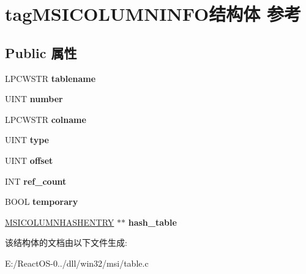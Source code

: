 \hypertarget{structtag_m_s_i_c_o_l_u_m_n_i_n_f_o}{}\section{tag\+M\+S\+I\+C\+O\+L\+U\+M\+N\+I\+N\+F\+O结构体 参考}
\label{structtag_m_s_i_c_o_l_u_m_n_i_n_f_o}
\subsection*{Public 属性}
\begin{DoxyCompactItemize}
\item 
\mbox{\label{structtag_m_s_i_c_o_l_u_m_n_i_n_f_o_a8b91ff1f272b2170f7fd5d6140db7f7a}} 
L\+P\+C\+W\+S\+TR {\bfseries tablename}
\item 
\mbox{\label{structtag_m_s_i_c_o_l_u_m_n_i_n_f_o_ab1903a24ac5c59794d47d21482c6c7a7}} 
U\+I\+NT {\bfseries number}
\item 
\mbox{\label{structtag_m_s_i_c_o_l_u_m_n_i_n_f_o_a799faf75925201bc21bfef0bc33a97e1}} 
L\+P\+C\+W\+S\+TR {\bfseries colname}
\item 
\mbox{\label{structtag_m_s_i_c_o_l_u_m_n_i_n_f_o_a80b4e1f96598c63c25c983898ebe4df3}} 
U\+I\+NT {\bfseries type}
\item 
\mbox{\label{structtag_m_s_i_c_o_l_u_m_n_i_n_f_o_a653bcaceaed44c20864226d84718867b}} 
U\+I\+NT {\bfseries offset}
\item 
\mbox{\label{structtag_m_s_i_c_o_l_u_m_n_i_n_f_o_ab0fe02d86ce915cf92690063a06f00d5}} 
I\+NT {\bfseries ref\+\_\+count}
\item 
\mbox{\label{structtag_m_s_i_c_o_l_u_m_n_i_n_f_o_ad1a863906e6267efb271311de711f23b}} 
B\+O\+OL {\bfseries temporary}
\item 
\mbox{\label{structtag_m_s_i_c_o_l_u_m_n_i_n_f_o_a6c4db88c9f5ed7ba15dcdaf4978a4ce5}} 
\hyperlink{structtag_m_s_i_c_o_l_u_m_n_h_a_s_h_e_n_t_r_y}{M\+S\+I\+C\+O\+L\+U\+M\+N\+H\+A\+S\+H\+E\+N\+T\+RY} $\ast$$\ast$ {\bfseries hash\+\_\+table}
\end{DoxyCompactItemize}


该结构体的文档由以下文件生成\+:\begin{DoxyCompactItemize}
\item 
E\+:/\+React\+O\+S-\/0../dll/win32/msi/table.\+c\end{DoxyCompactItemize}
